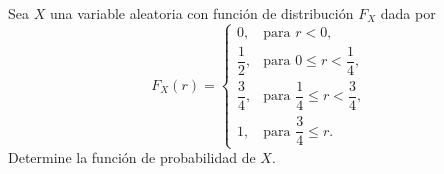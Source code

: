 \documentclass[12pt,a4paper]{article}
\begin{document}
    \begin{mdframed}[style=mdpinkbox,frametitle={Ejercicio 8}]
        Sea $X$ una variable aleatoria con función de distribución $F_{X}$ dada por
        \[
        F_{X}(r)=
        \begin{cases}
            0, & \text{para } r<0,\\[0.3cm]
            \dfrac{1}{2}, & \text{para } 0\leq r<\dfrac{1}{4},\\[0.4cm]
            \dfrac{3}{4}, & \text{para } \dfrac{1}{4}\leq r<\dfrac{3}{4},\\[0.4cm]
            1, & \text{para } \dfrac{3}{4}\leq r.
        \end{cases}
        \]
        Determine la función de probabilidad de $X$.
    \end{mdframed}
\end{document}
